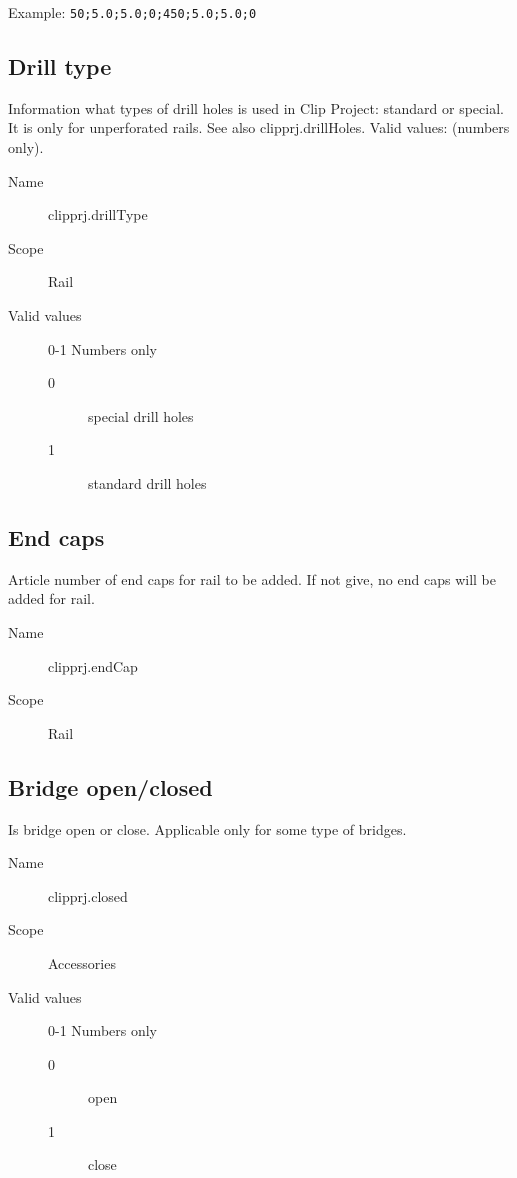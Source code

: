 \documentclass[%
	a4paper,
	oneside,
	listof=numbered,
	parskip=half,
	headsepline=true,
	footsepline=false,
	normalheadings,
	0.7headlines,
	headexclude,
	]{scrbook}
\begin{document}
Example: \verb|50;5.0;5.0;0;450;5.0;5.0;0|

\subsection{Drill type}

Information what types of drill holes is used in Clip Project: standard or special. It is only for unperforated rails. See also clipprj.drillHoles. Valid values: (numbers only).

\begin{description}
	\item[Name] clipprj.drillType
	\item[Scope] Rail
	\item[Valid values] 0-1 Numbers only
	\begin{description}
		\item[0] special drill holes
		\item[1] standard drill holes
	\end{description}
\end{description}

\subsection{End caps}

Article number of end caps for rail to be added. If not give, no end caps will be added for rail.

\begin{description}
	\item[Name] clipprj.endCap
	\item[Scope] Rail
\end{description}

\subsection{Bridge open/closed}

Is bridge open or close. Applicable only for some type of bridges.

\begin{description}
	\item[Name] clipprj.closed
	\item[Scope] Accessories
	\item[Valid values] 0-1 Numbers only
	\begin{description}
		\item[0] open
		\item[1] close
	\end{description}
\end{description}
\end{document}
